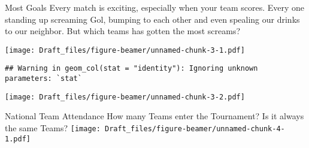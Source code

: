 \documentclass[
  ignorenonframetext,
]{beamer}
\begin{document}
\begin{frame}[fragile]{Most Goals}
\label{most-goals}
Every match is exciting, especially when your team scores. Every one
standing up screaming Gol, bumping to each other and even spealing our
drinks to our neighbor. But which teams has gotten the most screams?

\texttt{[image: Draft\_files/figure-beamer/unnamed-chunk-3-1.pdf]}

\begin{verbatim}
## Warning in geom_col(stat = "identity"): Ignoring unknown parameters: `stat`
\end{verbatim}

\texttt{[image: Draft\_files/figure-beamer/unnamed-chunk-3-2.pdf]}
\end{frame}

\begin{frame}{National Team Attendance}
\label{national-team-attendance}
How many Teams enter the Tournament? Is it always the same Teams?
\texttt{[image: Draft\_files/figure-beamer/unnamed-chunk-4-1.pdf]}
\end{frame}
\end{document}
